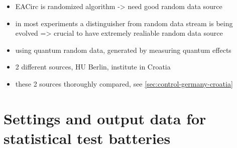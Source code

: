 \documentclass[12pt,oneside]{fithesis2}
\begin{document}
\begin{itemize}
\item EACirc is randomized algorithm -> need good random data source
\item in most experiments a distinguisher from random data stream is being evolved => crucial to have extremely realiable random data source
\item using quantum random data, generated by measuring quantum effects
\item 2 different sources, HU Berlin, institute in Croatia
\item these 2 sources thoroughly compared, see \autoref{sec:control-germany-croatia}
\end{itemize}

\section{Settings and output data for statistical test batteries}
\label{sec:settings-statistics}
\end{document}
